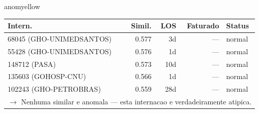 \documentclass[a4paper,10pt]{article}
\begin{document}
\begin{anomalycard}[Internacao 14434 | GHO-PETROBRAS | MODERADO (z=2.33)]{anomyellow}
\begin{tabular}{l r r r l}\toprule\textbf{Intern.} & \textbf{Simil.} & \textbf{LOS} & \textbf{Faturado} & \textbf{Status} \\\midrule
68045 (GHO-UNIMEDSANTOS) & 0.577 & 3d & --- & \textcolor{jcubeblue}{normal} \\
55428 (GHO-UNIMEDSANTOS) & 0.576 & 1d & --- & \textcolor{jcubeblue}{normal} \\
148712 (PASA) & 0.573 & 10d & --- & \textcolor{jcubeblue}{normal} \\
135603 (GOHOSP-CNU) & 0.566 & 1d & --- & \textcolor{jcubeblue}{normal} \\
102243 (GHO-PETROBRAS) & 0.559 & 28d & --- & \textcolor{jcubeblue}{normal} \\
\multicolumn{5}{l}{\textcolor{jcubeblue}{\small $\rightarrow$ Nenhuma similar e anomala --- esta internacao e verdadeiramente atipica.}} \\
\bottomrule\end{tabular}


\end{anomalycard}

\newpage
\end{document}
